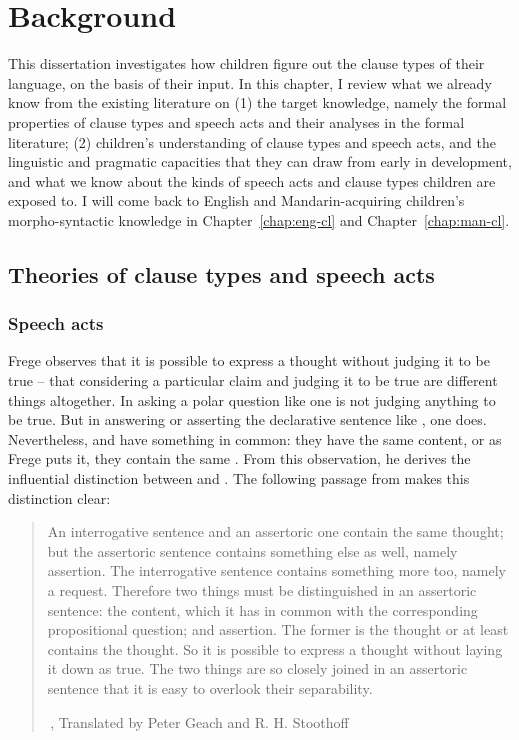 \chapter{Background}
\label{chap:background}

This dissertation investigates how children figure out the clause types of their language, on the basis of their input. In this chapter, I review what we already know from the existing literature on (1) the target knowledge, namely the formal properties of clause types and speech acts and their analyses in the formal literature; (2) children's understanding of clause types and speech acts, and the linguistic and pragmatic capacities that they can draw from early in development, and what we know about the kinds of speech acts and clause types children are exposed to. I will come back to English and Mandarin-acquiring children's morpho-syntactic knowledge in Chapter~\ref{chap:eng-cl} and Chapter~\ref{chap:man-cl}.

\section{Theories of clause types and speech acts} \label{sec:bg:theory}


\subsection{Speech acts} \label{sec:bg:theory:speech}

Frege observes that it is possible to express a thought without judging it to be true -- that considering a particular claim and judging it to be true are different things altogether. In asking a polar question like  one is not judging anything to be true. But in answering or asserting the declarative sentence like , one does. Nevertheless,  and  have something in common: they have the same content, or as Frege puts it, they contain the same . From this observation, he derives the influential distinction between  and . The following passage from  makes this distinction clear:

\begin{quote}
    

An interrogative sentence and an assertoric one contain the same thought; but the assertoric sentence contains something else as well, namely assertion. The interrogative sentence contains something more too, namely a request. Therefore two things must be distinguished in an assertoric sentence: the content, which it has in common with the corresponding propositional question; and assertion. The former is the thought or at least contains the thought. So it is possible to express a thought without laying it down as true. The two things are so closely joined in an assertoric sentence that it is easy to overlook their separability. 

$\,$\hfill \cite[62]{frege1918thought}, Translated by Peter Geach and R. H. Stoothoff
\end{quote}

